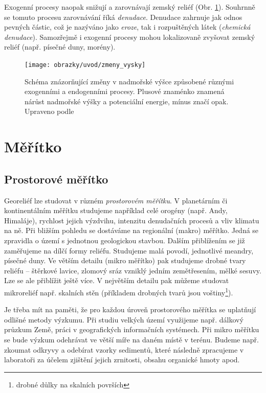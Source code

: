 Exogenní procesy naopak snižují a zarovnávají zemský reliéf (Obr. \ref{fig:zmenyvysky}). Souhrnně se tomuto procesu zarovnávání říká \emph{denudace}. Denudace zahrnuje jak odnos pevných částic, což je nazýváno jako \emph{eroze}, tak i rozpuštěných látek (\emph{chemická denudace}). Samozřejmě i exogenní procesy mohou lokalizovaně zvyšovat zemský reliéf (např. písečné duny, morény).

\begin{figure}[h]
	\centering
	\texttt{[image: obrazky/uvod/zmeny\_vysky]}
	\caption{Schéma znázorňující změny v nadmořské výšce způsobené různými exogenními a endogenními procesy. Plusové znaménko znamená nárůst nadmořské výšky a potenciální energie, mínus značí opak. Upraveno podle \textcite{summerfieldGlobalGeomorphologyIntroduction1999}}
	\label{fig:zmenyvysky}
\end{figure}


\section{Měřítko}
\subsection{Prostorové měřítko}
Georeliéf lze studovat v různém \emph{prostorovém měřítku}. V planetárním či kontinentálním měřítku studujeme například celé orogény (např. Andy, Himaláje), rychlost jejich výzdvihu, intenzitu denudačních procesů a vliv klimatu na ně. Při bližším pohledu se dostáváme na regionální (makro) měřítko. Jedná se zpravidla o území s jednotnou geologickou stavbou. Dalším přiblížením se již zaměřujeme na dílčí formy reliéfu. Studujeme malá povodí, jednotlivé meandry, písečné duny. Ve větším detailu (mikro měřítko) pak studujeme drobné tvary reliéfu -- štěrkové lavice, zlomový sráz vzniklý jedním zemětřesením, mělké sesuvy. Lze se ale přiblížit ještě více. V největším detailu pak můžeme studovat mikroreliéf např. skalních stěn (příkladem drobných tvarů jsou voštiny\footnote{drobné důlky na skalních površích}). 

Je třeba mít na paměti, že pro každou úroveň prostorového měřítka se uplatňují odlišné metody výzkumu. Při studiu velkých území využijeme např. dálkový průzkum Země, práci v geografických informačních systémech. Při mikro měřítku se bude výzkum odehrávat ve větší míře na daném místě v terénu. Budeme např. zkoumat odkryvy a odebírat vzorky sedimentů, které následně zpracujeme v laboratoři za účelem zjištění jejich zrnitosti, obsahu organické hmoty apod.

